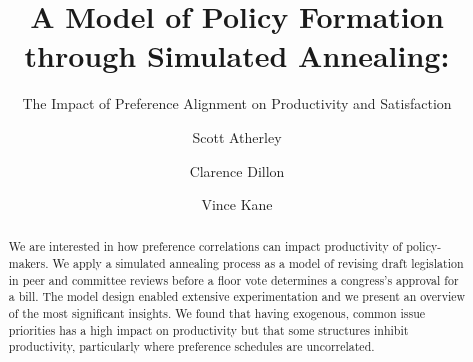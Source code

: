 \documentclass[pdftex,12pt,oribibl]{llncs}
\begin{document}
\title{A Model of Policy Formation through Simulated Annealing:}
\subtitle{The Impact of Preference Alignment on Productivity and Satisfaction}
\author{Scott Atherley \and Clarence Dillon \and Vince Kane}

\maketitle

%
%

\begin{abstract}
 We are interested in how preference correlations can impact productivity of policy-makers. 
 We apply a simulated annealing process as a model of revising draft legislation in peer and committee reviews before a floor vote determines a congress's approval for a bill.
 The model design enabled extensive experimentation and we present an overview of the most significant insights. We found that having exogenous, common issue priorities has a high impact on productivity but that some structures inhibit productivity, particularly where preference schedules are uncorrelated.
\end{abstract}
\end{document}
